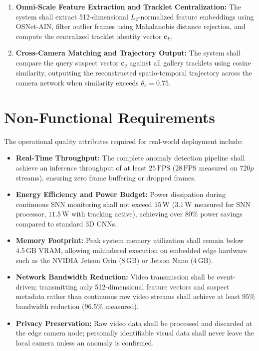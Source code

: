 \documentclass[12pt,a4paper]{report}
\begin{document}
\begin{enumerate}[{FR}-1:]
    \item \textbf{Omni-Scale Feature Extraction and Tracklet Centralization:} The system shall extract 512-dimensional $L_2$-normalized feature embeddings using OSNet-AIN, filter outlier frames using Mahalanobis distance rejection, and compute the centralized tracklet identity vector $\mathbf{c}_k$.
    \item \textbf{Cross-Camera Matching and Trajectory Output:} The system shall compare the query suspect vector $\mathbf{c}_q$ against all gallery tracklets using cosine similarity, outputting the reconstructed spatio-temporal trajectory across the camera network when similarity exceeds $\theta_s = 0.75$.
\end{enumerate}

\section{Non-Functional Requirements}
The operational quality attributes required for real-world deployment include:
\begin{itemize}
    \item \textbf{Real-Time Throughput:} The complete anomaly detection pipeline shall achieve an inference throughput of at least $25\,\text{FPS}$ ($28\,\text{FPS}$ measured on $720p$ streams), ensuring zero frame buffering or dropped frames.
    \item \textbf{Energy Efficiency and Power Budget:} Power dissipation during continuous SNN monitoring shall not exceed $15\,\text{W}$ ($3.1\,\text{W}$ measured for SNN processor, $11.5\,\text{W}$ with tracking active), achieving over $80\%$ power savings compared to standard 3D CNNs.
    \item \textbf{Memory Footprint:} Peak system memory utilization shall remain below $4.5\,\text{GB}$ VRAM, allowing unhindered execution on embedded edge hardware such as the NVIDIA Jetson Orin ($8\,\text{GB}$) or Jetson Nano ($4\,\text{GB}$).
    \item \textbf{Network Bandwidth Reduction:} Video transmission shall be event-driven; transmitting only 512-dimensional feature vectors and suspect metadata rather than continuous raw video streams shall achieve at least $95\%$ bandwidth reduction ($96.5\%$ measured).
    \item \textbf{Privacy Preservation:} Raw video data shall be processed and discarded at the edge camera node; personally identifiable visual data shall never leave the local camera unless an anomaly is confirmed.
\end{itemize}
\end{document}
